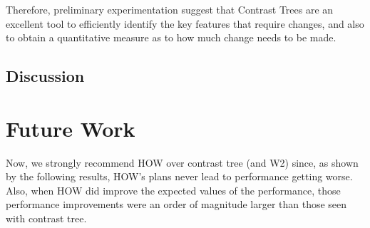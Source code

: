 \documentclass[conference]{IEEEtran}
\begin{document}
Therefore, preliminary experimentation suggest that Contrast  Trees  are  an excellent tool to efficiently identify the key features that require changes, and also  to  obtain  a  quantitative  measure  as  to  how much change needs to be made.

	\subsection{Discussion}

 
	\section{Future Work}
	Now, we strongly recommend HOW over contrast tree (and W2) since, as shown by the following results, HOW’s plans never lead to performance getting worse. Also, when HOW did improve the expected values of the performance, those performance improvements were an order of magnitude larger than those seen with contrast tree. 


\end{document}
